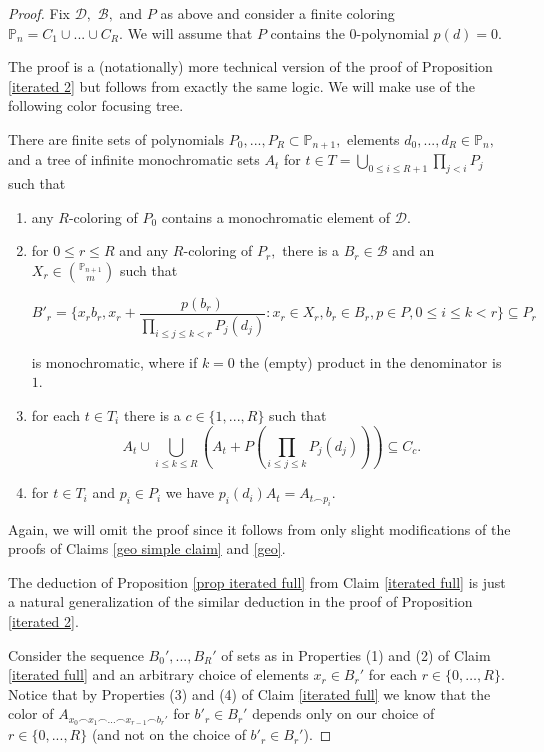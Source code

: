 \documentclass[tocmacros]{daj}
\begin{document}
\begin{proof}
Fix $\mathcal{D},$ $\mathcal{B},$ and $P$ as above and consider a finite coloring $\mathbb{P}_n=C_1\cup...\cup C_R.$  We will assume that $P$ contains the $0$-polynomial $p(d)=0.$

The proof is a (notationally) more technical version of the proof of Proposition \ref{iterated 2} but follows from exactly the same logic.  We will make use of the following color focusing tree.

\begin{claim}\label{iterated full}
There are finite sets of polynomials $P_0,...,P_R\subset \mathbb{P}_{n+1},$ elements $d_0,...,d_R\in \mathbb{P}_n,$ and a tree of infinite monochromatic sets $A_t$ for $t\in T=\bigcup_{0\leq i\leq R+1}\prod_{j<i}P_{j}$ such that

\begin{enumerate}
    \item any $R$-coloring of ${P}_{0}$ contains a monochromatic element of $\mathcal{D}.$
    \item for $0\leq r\leq R$ and any $R$-coloring of $P_r,$ there is a $B_r\in\mathcal{B}$ and an $X_r\in \binom{\mathbb{P}_{n+1}}{m}$ such that 
    
    $$B'_r=\{x_rb_r, x_r+\frac{p(b_r)}{\prod_{i\leq j \leq k<r} P_j(d_j)}: x_r\in X_r, b_r\in B_r, p\in P, 0\leq i\leq k<r\}\subseteq P_r$$
    
    is monochromatic, where if $k=0$ the (empty) product in the denominator is $1$.
    
    \item  for each $t\in T_i$ there is a $c\in \{1,...,R\}$ such that $$A_t\cup\bigcup_{i\leq k\leq R}(A_t+P(\prod_{i\leq j\leq k}P_j(d_j)))\subseteq C_c.$$
    \item for $t\in T_i$ and $p_i\in P_i$ we have $p_i(d_i)A_t=A_{t\smallfrown p_i}.$
\end{enumerate}
\end{claim}

Again, we will omit the proof since it follows from only slight modifications of the proofs of Claims \ref{geo simple claim} and \ref{geo}.

The deduction of Proposition \ref{prop iterated full} from Claim \ref{iterated full} is just a natural generalization of the similar deduction in the proof of Proposition \ref{iterated 2}.     

Consider the sequence $B_0',...,B_R'$ of sets as in Properties (1) and (2) of Claim \ref{iterated full} and an arbitrary choice of elements $x_r\in B_r'$ for each $r\in \{0,\ldots,R\}$.  Notice that by Properties (3) and (4) of Claim \ref{iterated full} we know that the color of $A_{x_0\smallfrown x_1\smallfrown\ldots\smallfrown x_{r-1}\smallfrown b_r'}$ for $b'_r\in B_r'$ depends only on our choice of $r\in \{0,...,R\}$ (and not on the choice of $b'_r\in B_r'$).   


\end{proof}
\end{document}
